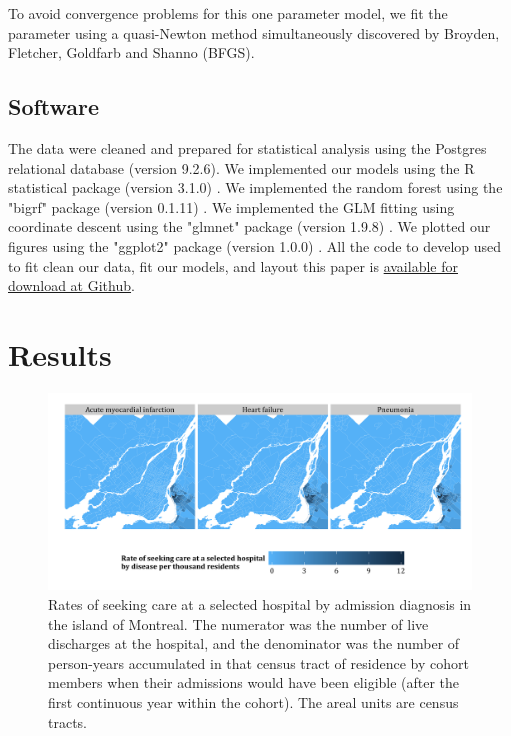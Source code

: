 \documentclass[]{article}\usepackage[]{graphicx}\usepackage[]{color}
\begin{document}
To avoid convergence problems for this one parameter model, we fit the parameter using a quasi-Newton method simultaneously discovered by Broyden\supercite{broyden_convergence_1970}, Fletcher\supercite{fletcher_new_1970}, Goldfarb\supercite{goldfarb_family_1970} and Shanno\supercite{shanno_conditioning_1970} (BFGS).


\subsection{Software}
The data were cleaned and prepared for statistical analysis using the Postgres relational database (version 9.2.6). We implemented our models using the R statistical package (version 3.1.0) \supercite{team_r:_2014}. We implemented the random forest using the "bigrf" package (version 0.1.11) \supercite{lim_bigrf:_2014}. We implemented the GLM fitting using coordinate descent using the "glmnet" package (version 1.9.8) \supercite{friedman_regularization_2010}. We plotted our figures using the "ggplot2" package (version 1.0.0) \supercite{wickham_ggplot2:_2009}. All the code to develop used to fit clean our data, fit our models, and layout this paper is \href{https://github.com/nograpes/tmle_readmissions}{available for download at Github}.


\section{Results}
\begin{figure}[H]
    \includegraphics{../figures/hosp_choro.png}
    \caption[Rates of seeking care at a selected hospital by admission diagnosis.]
{Rates of seeking care at a selected hospital by admission diagnosis in the island of Montreal. The numerator was the number of live discharges at the hospital, and the denominator was the number of person-years accumulated in that census tract of residence by cohort members when their admissions would have been eligible (after the first continuous year within the cohort). The areal units are census tracts.}
    \label{fig:hosp_choro}
\end{figure}
\end{document}
